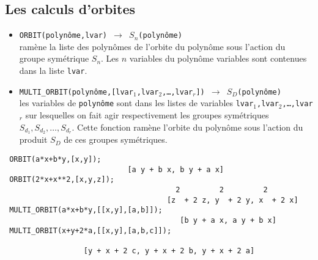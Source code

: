\subsection{Les calculs d'orbites}
\begin{itemize}
\item {\tt ORBIT(polyn\^ome,lvar) 
$\longrightarrow$ $S_n$(polyn\^ome) \\}
ram\`ene  la liste des polyn\^omes de l'orbite du polyn\^ome
sous l'action
du groupe sym\'etrique $S_n$. Les $n$ variables du polyn\^ome
variables sont contenues dans la liste {\tt lvar}.
\item {\tt MULTI\_ORBIT(polyn\^ome,[lvar$_{1}$,lvar$_{2}$,\ldots ,lvar$_{r}$])
$\longrightarrow$ ${S_D}$(polyn\^ome) }\\
les variables de {\tt polyn\^ome} sont dans les listes de variables
{\tt lvar$_1$,lvar$_{2}$,\ldots ,lvar$_{r}$} sur
lesquelles on fait agir respectivement les groupes sym\'etriques
$S_{d_1},S_{d_2},\ldots ,S_{d_r}$. Cette fonction
ram\`ene l'orbite du polyn\^ome sous l'action du produit
$S_D$ de ces groupes sym\'etriques.
\end{itemize}
\small
\begin{verbatim}
 ORBIT(a*x+b*y,[x,y]);
                            [a y + b x, b y + a x]
 ORBIT(2*x+x**2,[x,y,z]);
                                       2         2         2
                                     [z  + 2 z, y  + 2 y, x  + 2 x]
 MULTI_ORBIT(a*x+b*y,[[x,y],[a,b]]);
                                        [b y + a x, a y + b x]
 MULTI_ORBIT(x+y+2*a,[[x,y],[a,b,c]]);
 
                  [y + x + 2 c, y + x + 2 b, y + x + 2 a]
\end{verbatim}
\normalsize
